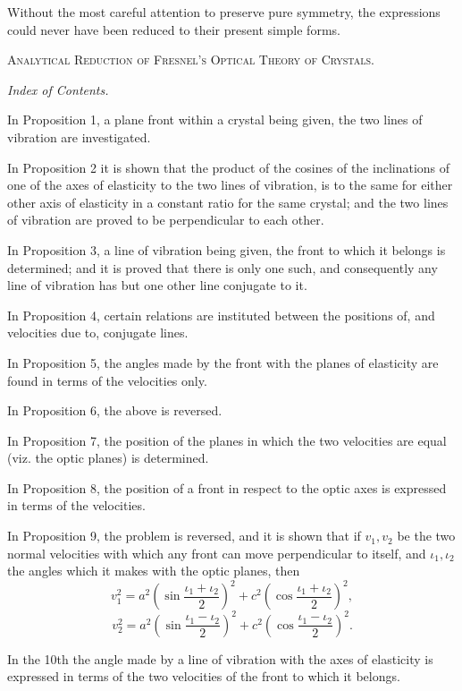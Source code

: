 \documentclass[11pt]{article}
\newcommand{\subpaperhead}[1]{\begin{center}{\large\scshape #1}\end{center}}
\newcommand{\sourcepage}[1]{\marginpar{\scriptsize p.~#1}}
\begin{document}
Without the most careful attention to preserve pure symmetry, the expressions could never have been reduced to their present simple forms.

\sourcepage{2}
\subpaperhead{Analytical Reduction of Fresnel's Optical Theory of Crystals.}

\begin{center}\itshape Index of Contents.\end{center}

In Proposition 1, a plane front within a crystal being given, the two lines of vibration are investigated.

In Proposition 2 it is shown that the product of the cosines of the inclinations of one of the axes of elasticity to the two lines of vibration, is to the same for either other axis of elasticity in a constant ratio for the same crystal; and the two lines of vibration are proved to be perpendicular to each other.

In Proposition 3, a line of vibration being given, the front to which it belongs is determined; and it is proved that there is only one such, and consequently any line of vibration has but one other line conjugate to it.

In Proposition 4, certain relations are instituted between the positions of, and velocities due to, conjugate lines.

In Proposition 5, the angles made by the front with the planes of elasticity are found in terms of the velocities only.

In Proposition 6, the above is reversed.

In Proposition 7, the position of the planes in which the two velocities are equal (viz. the optic planes) is determined.

In Proposition 8, the position of a front in respect to the optic axes is expressed in terms of the velocities.

In Proposition 9, the problem is reversed, and it is shown that if $v_1,v_2$ be the two normal velocities with which any front can move perpendicular to itself, and $\iota_1,\iota_2$ the angles which it makes with the optic planes, then
\[
 v_1^2=a^2\left(\sin\frac{\iota_1+\iota_2}{2}\right)^2
       +c^2\left(\cos\frac{\iota_1+\iota_2}{2}\right)^2,
\]
\[
 v_2^2=a^2\left(\sin\frac{\iota_1-\iota_2}{2}\right)^2
       +c^2\left(\cos\frac{\iota_1-\iota_2}{2}\right)^2.
\]

In the 10th the angle made by a line of vibration with the axes of elasticity is expressed in terms of the two velocities of the front to which it belongs.
\end{document}
